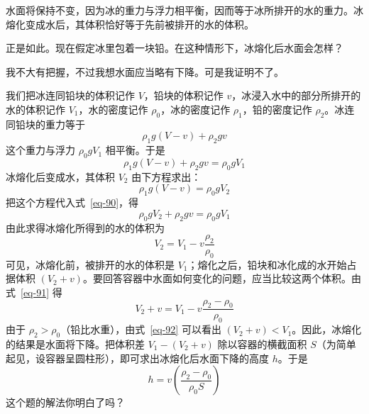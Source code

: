 \begin{dialogue}
\stda 水面将保持不变，因为冰的重力与浮力相平衡，因而等于冰所排开的水的重力。冰熔化变成水后，其体积恰好等于先前被排开的水的体积。

\tchr 正是如此。现在假定冰里包着一块铅。在这种情形下，冰熔化后水面会怎样？

\stda 我不大有把握，不过我想水面应当略有下降。可是我证明不了。

\tchr 我们把冰连同铅块的体积记作 $V$，铅块的体积记作 $v$，冰浸入水中的部分所排开的水的体积记作 $V_{1}$，水的密度记作 $\rho_{0}$，冰的密度记作 $\rho_{1}$，铅的密度记作 $\rho_{2}$。冰连同铅块的重力等于
\begin{equation*}%
\rho_{1} g (V-v) + \rho_{2}gv
\end{equation*}
这个重力与浮力 $\rho_{0}gV_{1}$ 相平衡。于是
\begin{equation}%
\rho_{1} g (V-v) + \rho_{2}g v = \rho_{0}g V_{1}
\label{eq-90}
\end{equation}
冰熔化后变成水，其体积 $V_{2}$ 由下方程求出：
\begin{equation*}
\rho_{1} g (V-v) = \rho_{0} gV_{2}
\end{equation*}
把这个方程代入式~\eqref{eq-90}，得
\begin{equation*}%
\rho_{0}gV_{2} + \rho_{2}gv = \rho_{0}gV_{1}
\end{equation*}
由此求得冰熔化所得到的水的体积为
\begin{equation}%
V_{2} = V_{1} -v \frac{\rho_{2}}{\rho_{0}}
\label{eq-91}
\end{equation}
可见，冰熔化前，被排开的水的体积是 $V_{1}$；熔化之后，铅块和冰化成的水开始占据体积 $(V_{2}+v)$。要回答容器中水面如何变化的问题，应当比较这两个体积。由式~\eqref{eq-91} 得
\begin{equation}%
V_{2} + v= V_{1} - v \frac{\rho_{2}-\rho_{0}}{\rho_{0}}
\label{eq-92}
\end{equation}
由于 $\rho_{2}>\rho_{0}$（铅比水重），由式~\eqref{eq-92} 可以看出 $(V_{2}+v)<V_{1}$。因此，冰熔化的结果是水面将下降。把体积差 $V_{1}-(V_{2}+v)$ 除以容器的横截面积 $S$（为简单起见，设容器呈圆柱形），即可求出冰熔化后水面下降的高度 $h$。于是
\begin{equation}%
h= v \left( \frac{\rho_{2}-\rho_{0}}{\rho_{0}S} \right)
\label{eq-93}
\end{equation}
这个题的解法你明白了吗？


\end{dialogue}
